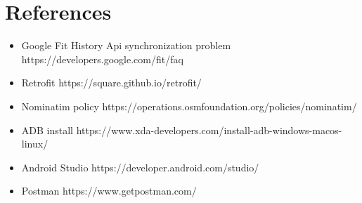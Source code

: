 \section{References}

\begin{itemize}
\item Google Fit History Api synchronization problem https://developers.google.com/fit/faq
\item Retrofit https://square.github.io/retrofit/
\item Nominatim policy https://operations.osmfoundation.org/policies/nominatim/
\item ADB install https://www.xda-developers.com/install-adb-windows-macos-linux/
\item Android Studio https://developer.android.com/studio/
\item Postman https://www.getpostman.com/
\end{itemize}